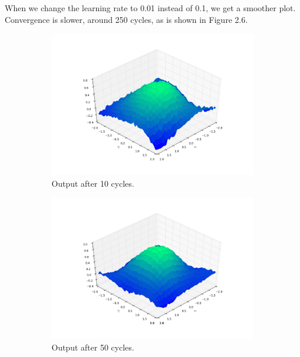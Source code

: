 \documentclass[a4paper,10pt]{article}
\numberwithin{equation}{section} %
\numberwithin{figure}{section} %
\numberwithin{table}{section} %
\theoremstyle{mytheor}
\begin{document}
\begin{enumerate}
		When we change the learning rate to 0.01 instead of 0.1, we get a smoother plot. Convergence is slower, around 250 cycles, as is shown in Figure 2.6.\\
		\begin{figure}[h!]
			\centering
			\begin{subfigure}[b]{0.45\textwidth}
				\includegraphics[width=\textwidth]{ex2_4llr_10.png}\vspace{-0.5cm}
				\caption{Output after 10 cycles.}
			\end{subfigure}
			\begin{subfigure}[b]{0.45\textwidth}
				\includegraphics[width=\textwidth]{ex2_4llr_50.png}\vspace{-0.5cm}
				\caption{Output after 50 cycles.}
			\end{subfigure}
			\begin{subfigure}[b]{0.45\textwidth}

\end{subfigure}
\end{figure}
\end{enumerate}
\end{document}
